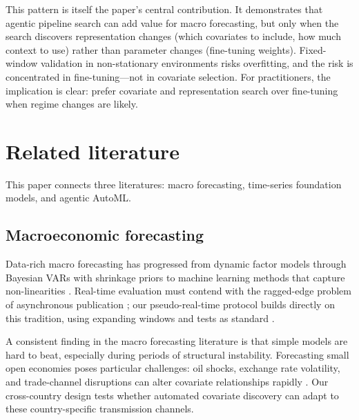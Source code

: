 \documentclass[12pt,a4paper]{article}
\begin{document}
This pattern is itself the paper's central contribution. It demonstrates that agentic pipeline search can add value for macro forecasting, but only when the search discovers representation changes (which covariates to include, how much context to use) rather than parameter changes (fine-tuning weights). Fixed-window validation in non-stationary environments risks overfitting, and the risk is concentrated in fine-tuning---not in covariate selection. For practitioners, the implication is clear: prefer covariate and representation search over fine-tuning when regime changes are likely.


\section{Related literature}
\label{sec:literature}

This paper connects three literatures: macro forecasting, time-series foundation models, and agentic AutoML.

\subsection{Macroeconomic forecasting}
\label{sec:lit_macro}

Data-rich macro forecasting has progressed from dynamic factor models \citep{stock2002macroeconomic,stock2002forecasting,forni2005generalized} through Bayesian VARs with shrinkage priors \citep{banbura2010large,koop2013large} to machine learning methods that capture non-linearities \citep{coulombe2022machine,babii2024econometrics}. Real-time evaluation must contend with the ragged-edge problem of asynchronous publication \citep{ghysels2004predicting,giannone2008nowcasting}; our pseudo-real-time protocol builds directly on this tradition, using expanding windows and \citet{diebold2002comparing} tests as standard \citep{clark2013advances}.

A consistent finding in the macro forecasting literature is that simple models are hard to beat, especially during periods of structural instability. Forecasting small open economies poses particular challenges: oil shocks, exchange rate volatility, and trade-channel disruptions can alter covariate relationships rapidly \citep{bjornland2019dutch,aastveit2023inflation}. Our cross-country design tests whether automated covariate discovery can adapt to these country-specific transmission channels.
\end{document}
